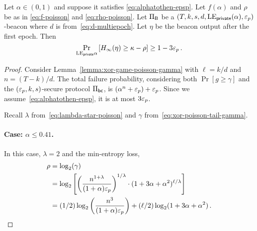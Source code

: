 \begin{lemma}\label{lemma:beacon-poisson-single-epoch}
  Let $\alpha \in (0, 1)$ and suppose it satisfies \eqref{eq:alphatothen-epsp}.
  Let $f(\alpha)$ and $\rho$ be as in \eqref{eq:f-poisson} and \eqref{eq:rho-poisson}.
  Let $\Pi_{\mathsf{B}}$ be a $(T,k,s,d,\mathrm{LE}_\mathsf{private}(\alpha), \mathsf{\varepsilon}_p)$-beacon 
  where $d$ is from~\eqref{eq:d-multiepoch}.
  Let $\eta$ be the beacon output after the first epoch. 
  Then 
  \begin{equation}\label{eq:security-bernoulli-single-epoch}
    \Pr_{\mathrm{LE}_\mathsf{private}{\alpha}}\left[H_\infty(\eta) \geq \kappa - \rho \right] \geq 1 - 3 \mathsf{\varepsilon}_p
    \,.
  \end{equation}
\end{lemma}

\begin{proof}  
  Consider Lemma~\ref{lemma:xor-game-poisson-gamma} 
  with $\ell = k/d$ and $n = (T-k)/d$. 
  The total failure probability, 
  considering both $\Pr[g \geq \gamma]$ and 
  the $(\mathsf{\varepsilon}_p, k, s)$-secure protocol $\Pi_\mathsf{bc}$, 
  is $(\alpha^n + \mathsf{\varepsilon}_p) + \mathsf{\varepsilon}_p$. 
  Since we assume~\eqref{eq:alphatothen-epsp}, it is at most $3 \mathsf{\varepsilon}_p$.

  Recall $\lambda$ from~\eqref{eq:lambda-star-poisson} and $\gamma$ from~\eqref{eq:xor-poisson-tail-gamma}.

  \paragraph{Case: $\alpha \leq 0.41$.}
  In this case, $\lambda = 2$ and 
  the min-entropy loss, 
  \begin{align*}
    \rho &= \log_2(\gamma) \\
        &= \log_2 \left[  \left(\frac{n^{1 + \lambda} }{ (1+\alpha) \mathsf{\varepsilon}_p} \right)^{1/\lambda}
          \cdot (1 + 3 \alpha + \alpha^2)^{\ell/\lambda}
        \right] \\
        &= (1/2)\log_2 \left(\frac{n^3}{ (1+\alpha) \mathsf{\varepsilon}_p} \right) 
          + (\ell/2) \log_2(1 + 3 \alpha + \alpha^2)
        \,.
  \end{align*}
  

\end{proof}

